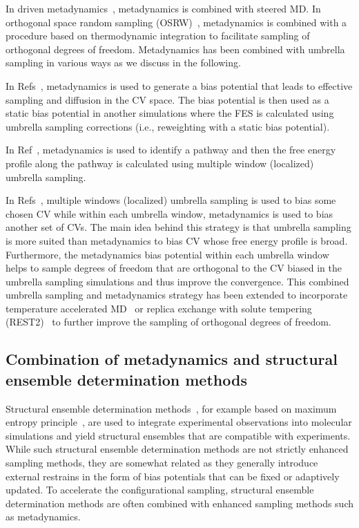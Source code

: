 \documentclass[9pt,review]{livecoms}
\begin{document}
In driven metadynamics~\cite{Moradi_DrivenMetaD_JPCL2013}, metadynamics is combined with steered MD.
In orthogonal space random sampling (OSRW)~\cite{Zheng_OSRW-1_PNAS2008,Zheng_OSRW-2_JCP2009,Min_OSRW-3_JCTC2010}, metadynamics is combined with a procedure based on thermodynamic integration to facilitate sampling of orthogonal degrees of freedom. Metadynamics has been combined with umbrella sampling in various ways as we discuss in the following.

In Refs~\cite{Badin_MetaD-US-1_JCP2006,Autieri_MetaD-US-2_JCP2010}, metadynamics is used to generate a bias potential that leads to effective sampling and diffusion in the CV space. The bias potential is then used as a static bias potential in another simulations where the FES is calculated using umbrella sampling corrections (i.e., reweighting with a static bias potential).

In Ref~\cite{Zhang_MetaD-US-3_JCTC2013}, metadynamics is used to identify a pathway and then the free energy profile along the pathway is calculated using multiple window (localized) umbrella sampling.

In Refs~\cite{Johnston_MetaD-US-4_PLos2012,Awasthi_MetaD-US-5_JCC2016}, multiple windows (localized) umbrella sampling is used to bias some chosen CV while within each umbrella window, metadynamics is used to bias another set of CVs. The main idea behind this strategy is that umbrella sampling is more suited than metadynamics to bias CV whose free energy profile is broad. Furthermore, the metadynamics bias potential within each umbrella window helps to sample degrees of freedom that are orthogonal to the CV biased in the umbrella sampling simulations and thus improve the convergence. This combined umbrella sampling and metadynamics strategy has been extended to incorporate temperature accelerated MD~\cite{Awasthi_TASS_JCP2017,Pal_TASS-2_JCC2021} or replica exchange with solute tempering (REST2)~\cite{Kapakayala_WS-MetaD+REST2_JCC2021} to further improve the sampling of orthogonal degrees of freedom.


\subsection{Combination of metadynamics and structural ensemble determination methods}

Structural ensemble determination methods~\cite{Bonomi_StructEnsembleDeterm_Review_COSB2017,Cesari_MaximumEntropyPrinciple_Review_Comp2018,Bottaro_Science2018}, for example based on maximum entropy principle~\cite{Pitera_MaxEnt_JCTC2012,Roux_MaxEnt_JCP2013}, are used to integrate experimental observations into molecular simulations and yield structural ensembles that are compatible with experiments. While such structural ensemble determination methods are not strictly enhanced sampling methods, they are somewhat related as they generally introduce external restrains in the form of bias potentials that can be fixed or adaptively updated. To accelerate the configurational sampling, structural ensemble determination methods are often combined with enhanced sampling methods such as metadynamics.
\end{document}

